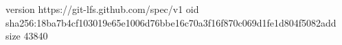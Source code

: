 version https://git-lfs.github.com/spec/v1
oid sha256:18ba7b4cf103019e65e1006d76bbe16c70a3f16f870c069d1fe1d804f5082add
size 43840
